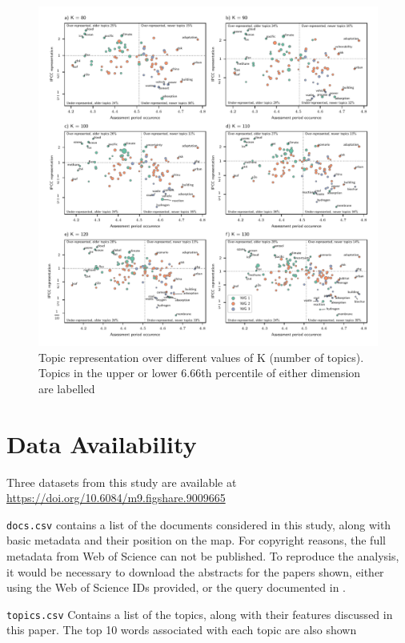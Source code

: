 \documentclass{article}
\begin{document}
	\begin{figure}
		\begin{center}
			\includegraphics[width=1\linewidth]{../plots_pub/topic_rep_ks.pdf}
			\caption{Topic representation over different values of K (number of topics). Topics in the upper or lower 6.66th percentile of either dimension are labelled}
			\label{top-rep-ks}
		\end{center}
	\end{figure}
	
	\section*{Data Availability}
	
	Three datasets from this study are available at \url{https://doi.org/10.6084/m9.figshare.9009665}
	
	\medskip\noindent
	\texttt{docs.csv} contains a list of the documents considered in this study, along with basic metadata and their position on the map. For copyright reasons, the full metadata from Web of Science can not be published. To reproduce the analysis, it would be necessary to download the abstracts for the papers shown, either using the Web of Science IDs provided, or the query documented in \cite{Grieneisen2011}.
	
	\medskip\noindent
	\texttt{topics.csv} Contains a list of the topics, along with their features discussed in this paper. The top 10 words associated with each topic are also shown
	
\end{document}
